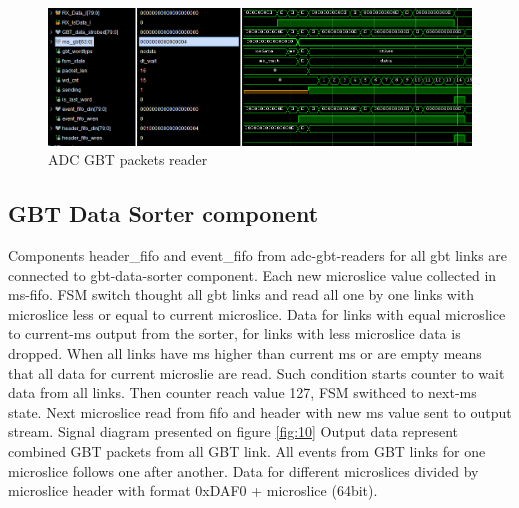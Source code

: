 \documentclass{article}
\begin{document}
\begin{figure}[H]
	\centering 
	\includegraphics[width=1.0\textwidth]{ADC_GBT_reader_wave.png}
	\caption{\label{fig:11} ADC GBT packets reader}
\end{figure}















\subsection{GBT Data Sorter component}
Components header\_fifo and event\_fifo from adc-gbt-readers for all gbt links are connected to gbt-data-sorter component. Each new microslice value collected in ms-fifo. FSM switch thought all gbt links and read all one by one links with microslice less or equal to current microslice. Data for links with equal microslice to current-ms output from the sorter, for links with less microslice data is dropped. When all links have ms higher than current ms or are empty means that all data for current microslie are read. Such condition starts counter to wait data from all links. Then counter reach value 127, FSM swithced to next-ms state. Next microslice read from fifo and header with new ms value sent to output stream. Signal diagram presented on figure \ref{fig:10} Output data represent combined GBT packets from all GBT link. All events from GBT links for one microslice follows one after another. Data for different microslices divided by microslice header with format 0xDAF0 + microslice (64bit). 
\end{document}
